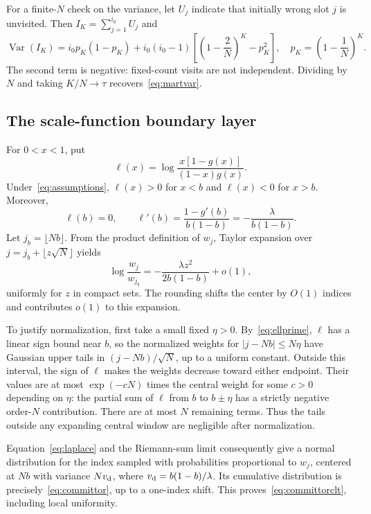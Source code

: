 \documentclass[11pt]{article}
\theoremstyle{remark}\newtheorem{remark}[theorem]{Remark}
\begin{document}
For a finite-$N$ check on the variance, let $U_j$ indicate that initially wrong slot $j$ is unvisited. Then $I_K=\sum_{j=1}^{i_0}U_j$ and
\begin{equation}
 \operatorname{Var}(I_K)=i_0p_K(1-p_K)+i_0(i_0-1)
 \left[\left(1-\frac2N\right)^K-p_K^2\right],
 \quad p_K=\left(1-\frac1N\right)^K.
 \label{eq:exactvariance}
\end{equation}
The second term is negative: fixed-count visits are not independent. Dividing by $N$ and taking $K/N\to\tau$ recovers~\eqref{eq:martvar}.

\subsection{The scale-function boundary layer}
For $0<x<1$, put
\begin{equation}
 \ell(x)=\log\frac{x[1-g(x)]}{(1-x)g(x)}.
\end{equation}
Under~\eqref{eq:assumptions}, $\ell(x)>0$ for $x<b$ and $\ell(x)<0$ for $x>b$. Moreover,
\begin{equation}
 \ell(b)=0,\qquad
 \ell'(b)=\frac{1-g'(b)}{b(1-b)}=-\frac{\lambda}{b(1-b)}.
 \label{eq:ellprime}
\end{equation}
Let $j_b=\lfloor Nb\rfloor$. From the product definition of $w_j$, Taylor expansion over $j=j_b+\lfloor z\sqrt N\rfloor$ yields
\begin{equation}
 \log\frac{w_j}{w_{j_b}}
 =-\frac{\lambda z^2}{2b(1-b)}+o(1),
 \label{eq:laplace}
\end{equation}
uniformly for $z$ in compact sets. The rounding shifts the center by $O(1)$ indices and contributes $o(1)$ to this expansion.

To justify normalization, first take a small fixed $\eta>0$. By~\eqref{eq:ellprime}, $\ell$ has a linear sign bound near $b$, so the normalized weights for $|j-Nb|\le N\eta$ have Gaussian upper tails in $(j-Nb)/\sqrt N$, up to a uniform constant. Outside this interval, the sign of $\ell$ makes the weights decrease toward either endpoint. Their values are at most $\exp(-cN)$ times the central weight for some $c>0$ depending on $\eta$: the partial sum of $\ell$ from $b$ to $b\pm\eta$ has a strictly negative order-$N$ contribution. There are at most $N$ remaining terms. Thus the tails outside any expanding central window are negligible after normalization.

Equation~\eqref{eq:laplace} and the Riemann-sum limit consequently give a normal distribution for the index sampled with probabilities proportional to $w_j$, centered at $Nb$ with variance $Nv_{\rm d}$, where $v_{\rm d}=b(1-b)/\lambda$. Its cumulative distribution is precisely~\eqref{eq:committor}, up to a one-index shift. This proves~\eqref{eq:committorclt}, including local uniformity.
\end{document}
